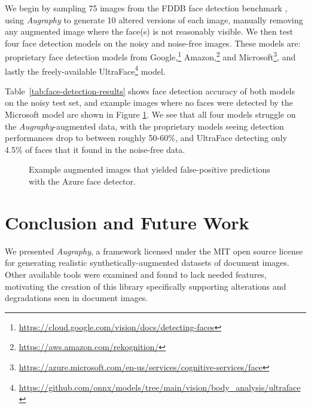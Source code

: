 \documentclass[runningheads]{llncs}
\begin{document}
We begin by sampling 75 images from the FDDB face detection benchmark \cite{fddbTech}, using \emph{Augraphy} to generate 10 altered versions of each image, manually removing any augmented image where the face(s) is not reasonably visible.
We then test four face detection models on the noisy and noise-free images.
These models are: proprietary face detection models from Google,\footnote{\url{https://cloud.google.com/vision/docs/detecting-faces}} Amazon,\footnote{\url{https://aws.amazon.com/rekognition/}} and Microsoft\footnote{\url{https://azure.microsoft.com/en-us/services/cognitive-services/face}}, and lastly the freely-available UltraFace\footnote{\url{https://github.com/onnx/models/tree/main/vision/body_analysis/ultraface}} model.

Table~\ref{tab:face-detection-results} shows face detection accuracy of both models on the noisy test set, and example images where no faces were detected by the Microsoft model are shown in Figure \ref{fig:face-detection-mistakes}.
We see that all four models struggle on the \emph{Augraphy}-augmented data, with the proprietary models seeing detection performances drop to between roughly 50-60\%, and UltraFace detecting only 4.5\% of faces that it found in the noise-free data.

\begin{figure}
    \centering{}
    \caption{Example augmented images that yielded false-positive predictions with the Azure face detector.}
    \label{fig:face-detection-mistakes}
\end{figure}

\section{Conclusion and Future Work}
We presented \emph{Augraphy}, a framework licensed under the MIT open source license for generating realistic synthetically-augmented datasets of document images.
Other available tools were examined and found to lack needed features, motivating the creation of this library specifically supporting alterations and degradations seen in document images.
\end{document}
